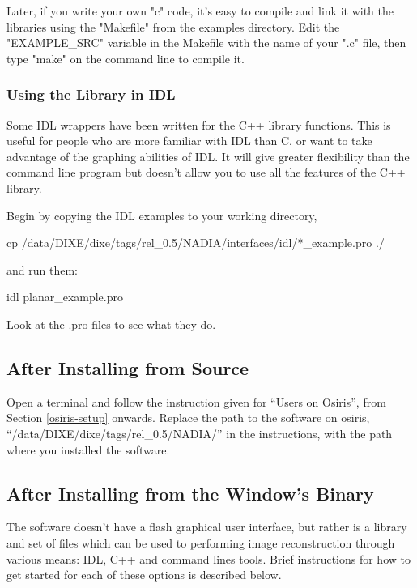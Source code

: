 \documentclass[]{cxs-software}
\begin{document}
Later, if you write your own "c" code, it's easy to compile and link
it with the libraries using the "Makefile" from the examples
directory. Edit the "EXAMPLE\_SRC" variable in the Makefile with the
name of your ".c" file, then type "make" on the command line to
compile it.

\subsubsection{Using the Library in IDL}

Some IDL wrappers have been written for the C++ library
functions. This is useful for people who are more familiar with IDL
than C, or want to take advantage of the graphing abilities of IDL.
It will give greater flexibility than the command line program but
doesn't allow you to use all the features of the C++ library.

Begin by copying the IDL examples to your working directory, 
\begin{myverbatim}
   cp /data/DIXE/dixe/tags/rel_0.5/NADIA/interfaces/idl/*_example.pro ./ 
\end{myverbatim}
and run them: 
\begin{myverbatim}
   idl planar_example.pro
\end{myverbatim}

Look at the .pro files to see what they do. 


\subsection{After Installing from Source}

Open a terminal and follow the instruction given for ``Users on
Osiris'', from Section \ref{osiris-setup} onwards. Replace the path to
the software on osiris,
``/data/DIXE/dixe/tags/rel\_0.5/NADIA/'' in the instructions,
with the path where you installed the software.

\subsection{After Installing from the Window's Binary}

The software doesn't have a flash graphical user interface, but rather
is a library and set of files which can be used to performing image
reconstruction through various means: IDL, C++ and command lines
tools. Brief instructions for how to get started for each of these
options is described below.
\end{document}
